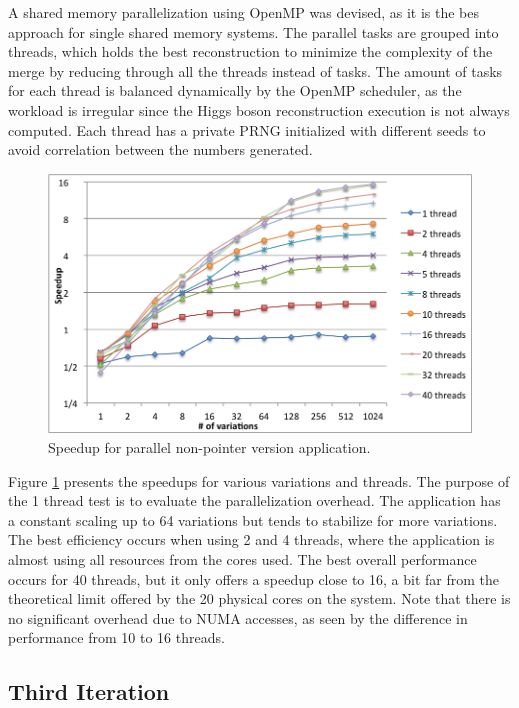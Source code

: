 A shared memory parallelization using OpenMP was devised, as it is the bes approach for single shared memory systems. The parallel tasks are grouped into threads, which holds the best reconstruction to minimize the complexity of the merge by reducing through all the threads instead of tasks. The amount of tasks for each thread is balanced dynamically by the OpenMP scheduler, as the workload is irregular since the Higgs boson reconstruction execution is not always computed. Each thread has a private PRNG initialized with different seeds to avoid correlation between the numbers generated.

\begin{figure}[!htp]
	\begin{center}
		\includegraphics[scale=0.4]{charts/speedup_non_pointer_omp.png}
		\caption{Speedup for \tth parallel non-pointer version application.}
		\label{fig:non_pointer_speedup}
	\end{center}
\end{figure}

Figure \ref{fig:non_pointer_speedup} presents the speedups for various variations and threads. The purpose of the 1 thread test is to evaluate the parallelization overhead. The application has a constant scaling up to 64 variations but tends to stabilize for more variations. The best efficiency occurs when using 2 and 4 threads, where the application is almost using all resources from the cores used. The best overall performance occurs for 40 threads, but it only offers a speedup close to 16, a bit far from the theoretical limit offered by the 20 physical cores on the system. Note that there is no significant overhead due to NUMA accesses, as seen by the difference in performance from 10 to 16 threads.

\subsection{Third Iteration}

